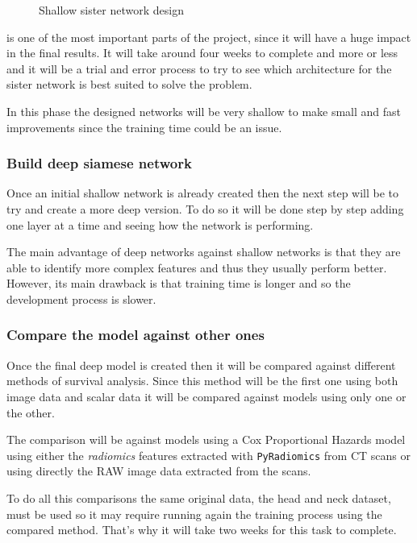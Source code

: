 \begin{figure}
  \centering
  
  \caption{Shallow sister network design \label{fig:shallow-sister}}
\end{figure}

 is one of the most important parts of the project, since it will have a huge
impact in the final results. It will take around four weeks to complete and more or less
and it will be a trial and error process to try to see which architecture for the sister
network is best suited to solve the problem.

In this phase the designed networks will be very shallow to make small and fast improvements
since the training time could be an issue.

\subsubsection{Build deep siamese network}

Once an initial shallow network is already created then the next step will be to try 
and create a more deep version. To do so it will be done step by step adding one layer
at a time and seeing how the network is performing.

The main advantage of deep networks against shallow networks is that they are able to
identify more complex features and thus they usually perform better. However, its 
main drawback is that training time is longer and so the development process is 
slower.

\subsubsection{Compare the model against other ones}

Once the final deep model is created then it will be compared against different methods of 
survival analysis. Since this method will be the first one using both image data and scalar 
data it will be compared against models using only one or the other. 

The comparison will be against models using a Cox Proportional Hazards model using either
the \emph{radiomics} features extracted with \texttt{PyRadiomics} from CT scans or using 
directly the RAW image data extracted from the scans.

To do all this comparisons the same original data, the head and neck dataset, must be 
used so it may require running again the training process using the compared method. 
That's why it will take two weeks for this task to complete.


